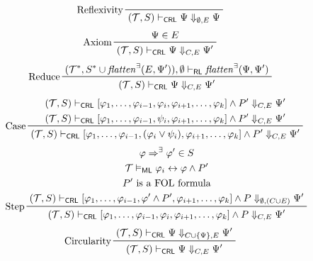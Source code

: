 \begin{figure}
    \centering
    \begin{align*}
    & \prftree[l]{Reflexivity}{(\mathcal{T}, S) \vdash_\CRL \Psi \Downarrow_{\emptyset,E} \Psi}
    \end{align*}
    \begin{align*}
    & \prftree[l]{Axiom}{\Psi \in E}{(\mathcal{T}, S) \vdash_\CRL \Psi \Downarrow_{C,E} \Psi^\prime}
    \end{align*}
    \begin{align*}
    & \prftree[l]{Reduce}
      {(\mathcal{T}^*, S^* \cup \mathit{flatten}^\exists(E, \Psi^\prime)), \emptyset \vdash_\RL
        \mathit{flatten}^\exists(\Psi, \Psi^\prime) }
      {(\mathcal{T}, S) \vdash_\CRL \Psi \Downarrow_{C,E} \Psi^\prime}
    \end{align*}
    \begin{align*}
    & \prftree[l]{Case}
    { \prfStackPremises
      {(\mathcal{T}, S) \vdash_\CRL [\varphi_1, \ldots, \varphi_{i-1}, \varphi_i, \varphi_{i+1}, \ldots, \varphi_k] \land P^\prime \Downarrow_{C, E} \Psi^\prime }
      {(\mathcal{T}, S) \vdash_\CRL [\varphi_1, \ldots, \varphi_{i-1}, \psi_i, \varphi_{i+1}, \ldots, \varphi_k] \land P^\prime \Downarrow_{C, E} \Psi^\prime }
    }
    {(\mathcal{T}, S) \vdash_\CRL [\varphi_1, \ldots, \varphi_{i-1}, (\varphi_i \lor \psi_i), \varphi_{i+1}, \ldots, \varphi_k] \land P^\prime \Downarrow_{C, E} \Psi^\prime}
    \end{align*}
    \begin{align*}
    & \prftree[l]{Step}
    { \prfStackPremises
       {\varphi \Rightarrow^\exists \varphi^\prime \in S}
       {\mathcal{T} \vDash_\ML \varphi_i \leftrightarrow \varphi \land P^\prime}
       {P^\prime \mbox{ is a FOL formula}}
       {  (\mathcal{T}, S) \vdash_\CRL [\varphi_1, \ldots, \varphi_{i-1}, \varphi^\prime \land P^\prime, \varphi_{i+1}, \ldots, \varphi_k]
          \land P
          \Downarrow_{\emptyset, (C \cup E)} \Psi^\prime
      }
    }
    {(\mathcal{T}, S) \vdash_\CRL [\varphi_1, \ldots, \varphi_{i-1}, \varphi_i, \varphi_{i+1}, \ldots, \varphi_k] \land P \Downarrow_{C, E} \Psi^\prime}
    \end{align*}
    \begin{align*}
    & \prftree[l]{Circularity}
      { (\mathcal{T}, S) \vdash_\CRL \Psi \Downarrow_{C \cup \{ \Psi \} , E} \Psi^\prime}
      { (\mathcal{T}, S) \vdash_\CRL \Psi \Downarrow_{C, E} \Psi^\prime}
    \end{align*}
    \begin{align*}

\end{align*}
\end{figure}
